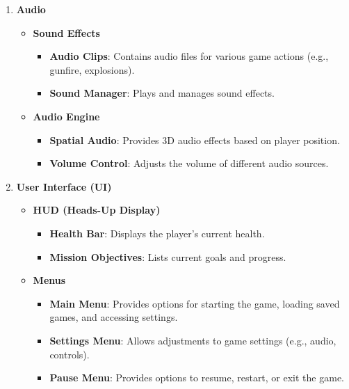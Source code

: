 \begin{enumerate}
	\item \textbf{Audio}
	\begin{itemize}
		\item \textbf{Sound Effects}
		\begin{itemize}
			\item \textbf{Audio Clips}: Contains audio files for various game actions (e.g., gunfire, explosions).
			\item \textbf{Sound Manager}: Plays and manages sound effects.
		\end{itemize}
		\item \textbf{Audio Engine}
		\begin{itemize}
			\item \textbf{Spatial Audio}: Provides 3D audio effects based on player position.
			\item \textbf{Volume Control}: Adjusts the volume of different audio sources.
		\end{itemize}
	\end{itemize}
	\item \textbf{User Interface (UI)}
	\begin{itemize}
		\item \textbf{HUD (Heads-Up Display)}
		\begin{itemize}
			\item \textbf{Health Bar}: Displays the player's current health.
			\item \textbf{Mission Objectives}: Lists current goals and progress.
		\end{itemize}
		\item \textbf{Menus}
		\begin{itemize}
			\item \textbf{Main Menu}: Provides options for starting the game, loading saved games, and accessing settings.
			\item \textbf{Settings Menu}: Allows adjustments to game settings (e.g., audio, controls).
			\item \textbf{Pause Menu}: Provides options to resume, restart, or exit the game.
		\end{itemize}
	\end{itemize}
	

\end{enumerate}
